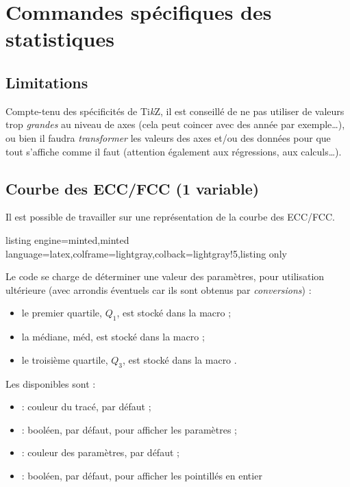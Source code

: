 \documentclass[11pt,a4paper]{ltxdoc}
\providecommand\tikzlogo{Ti\textit{k}Z}
\let\TikZ\tikzlogo
\begin{document}
\pagebreak

\section{Commandes spécifiques des statistiques}

\subsection{Limitations}

Compte-tenu des spécificités de \TikZ, il est conseillé de ne pas utiliser de valeurs trop \textit{grandes} au niveau de axes (cela peut coincer avec des année par exemple\ldots), ou bien il faudra \textit{transformer} les valeurs des axes et/ou des données pour que tout s'affiche comme il faut (attention également aux régressions, aux calculs\ldots).

\subsection{Courbe des ECC/FCC (1 variable)}\label{cbeECC}

Il est possible de travailler sur une représentation de la courbe des ECC/FCC.

\begin{tcblisting}{listing engine=minted,minted language=latex,colframe=lightgray,colback=lightgray!5,listing only}
\end{tcblisting}

Le code se charge de déterminer une valeur des paramètres, pour utilisation ultérieure (avec arrondis éventuels car ils sont obtenus par \textit{conversions}) :

\begin{itemize}
	\item le premier quartile, $Q_1$, est stocké dans la macro  ;
	\item la médiane, méd, est stocké dans la macro  ;
	\item le troisième quartile, $Q_3$, est stocké dans la macro .
\end{itemize}

Les  disponibles sont :

\begin{itemize}
	\item {} : couleur du tracé,  par défaut ;
	\item {} : booléen,  par défaut, pour afficher les paramètres ;
	\item {} : couleur des paramètres,  par défaut ;
	\item {} : booléen,  par défaut, pour afficher les pointillés en entier
\end{itemize}
\end{document}
